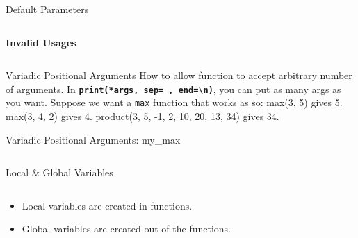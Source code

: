         \begin{frame}{Default Parameters}
            \LARGE
            \inputminted[frame=single,framesep=2pt, lastline=15]{python3}{code-examples/default.py}
            \pause
            \textbf{Invalid Usages}
            \inputminted[frame=single,framesep=2pt, lastline=15]{python3}{code-examples/valid2.py}  
        \end{frame}

        \begin{frame}{Variadic Positional Arguments}
            \pause
            \LARGE
            How to allow function to accept arbitrary number of arguments.
            \newline
            In \textbf{\texttt{print(*args, sep=\textquotesingle \ \textquotesingle, end=\textquotesingle \textbackslash n\textquotesingle )}}, 
            you can put as many args as you want.
            \pause
            \newline 
            \newline Suppose we want a \texttt{max} function that works as so:
            \newline max(3, 5) gives 5.
            \newline max(3, 4, 2) gives 4.
            \newline product(3, 5, -1, 2, 10, 20, 13, 34) gives 34.
            \newline 
        \end{frame}

        \begin{frame}{Variadic Positional Arguments: my\_max}
          \pause
          \Large
          \inputminted[frame=single,framesep=2pt]{python3}{code-examples/variadic.py}
        
        \end{frame}

        \begin{frame}{Local \& Global Variables}
            \begin{columns}
                \begin{column}{0.50\textwidth}
                    \begin{itemize}
                        \item Local variables are created in functions.
                        \item Global variables are created out of the functions.
                    \end{itemize}
                    \inputminted[frame=single,framesep=2pt, lastline=15]{python3}{code-examples/var.py}
                \end{column}
                \begin{column}{0.50\textwidth}
                    \inputminted[frame=single,framesep=2pt, lastline=15]{python3}{code-examples/var2.py}                    
                    \inputminted[frame=single,framesep=2pt, lastline=15]{python3}{code-examples/var3.py}                    
                \end{column}
            \end{columns}
        \end{frame}

